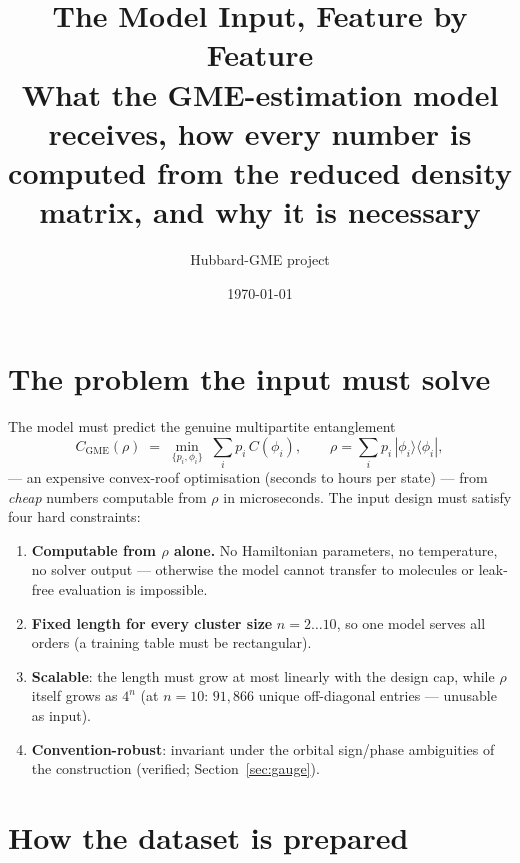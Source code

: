 \documentclass[11pt]{article}
\title{\textbf{The Model Input, Feature by Feature}\\[4pt]
       \large What the GME-estimation model receives, how every number is
       computed from the reduced density matrix, and why it is necessary}
\author{Hubbard-GME project}
\date{\today}
\newcommand{\CGME}{\ensuremath{C_{\mathrm{GME}}}}
\begin{document}
\maketitle
\tableofcontents
\bigskip

\section{The problem the input must solve}
The model must predict the genuine multipartite entanglement
\[
  \CGME(\rho)\;=\;\min_{\{p_i,\phi_i\}}\;\sum_i p_i\,C(\phi_i),
  \qquad \rho=\sum_i p_i\,|\phi_i\rangle\langle\phi_i|,
\]
--- an expensive convex-roof optimisation (seconds to hours per state) ---
from \emph{cheap} numbers computable from $\rho$ in microseconds. The input
design must satisfy four hard constraints:
\begin{enumerate}[nosep]
  \item \textbf{Computable from $\rho$ alone.} No Hamiltonian parameters, no
        temperature, no solver output --- otherwise the model cannot transfer
        to molecules or leak-free evaluation is impossible.
  \item \textbf{Fixed length for every cluster size} $n=2\ldots10$, so one
        model serves all orders (a training table must be rectangular).
  \item \textbf{Scalable}: the length must grow at most linearly with the
        design cap, while $\rho$ itself grows as $4^n$ (at $n{=}10$:
        $91{,}866$ unique off-diagonal entries --- unusable as input).
  \item \textbf{Convention-robust}: invariant under the orbital sign/phase
        ambiguities of the construction (verified; Section~\ref{sec:gauge}).
\end{enumerate}

\section{How the dataset is prepared}
\end{document}
